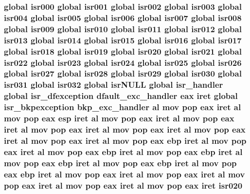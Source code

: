 \subsubsection[{\texorpdfstring{isr020}{isr020}}]{\setlength{\rightskip}{0pt plus 5cm}global {\bf isr000} global {\bf isr001} global {\bf isr002} global {\bf isr003} global {\bf isr004} global {\bf isr005} global {\bf isr006} global {\bf isr007} global {\bf isr008} global {\bf isr009} global {\bf isr010} global {\bf isr011} global {\bf isr012} global {\bf isr013} global {\bf isr014} global {\bf isr015} global {\bf isr016} global {\bf isr017} global {\bf isr018} global {\bf isr019} global isr020 global {\bf isr021} global {\bf isr022} global {\bf isr023} global {\bf isr024} global {\bf isr025} global {\bf isr026} global {\bf isr027} global {\bf isr028} global {\bf isr029} global {\bf isr030} global {\bf isr031} global isr032 global isr\+N\+U\+LL global isr\+\_\+handler global {\bf isr\+\_\+dfexception} {\bf dfault\+\_\+exc\+\_\+handler} eax iret global {\bf isr\+\_\+bkpexception} {\bf bkp\+\_\+exc\+\_\+handler} {\bf al} {\bf mov} pop eax iret {\bf al} {\bf mov} pop eax esp iret {\bf al} {\bf mov} pop eax iret {\bf al} {\bf mov} pop eax iret {\bf al} {\bf mov} pop eax iret {\bf al} {\bf mov} pop eax iret {\bf al} {\bf mov} pop eax iret {\bf al} {\bf mov} pop eax iret {\bf al} {\bf mov} pop eax ebp iret {\bf al} {\bf mov} pop eax iret {\bf al} {\bf mov} pop eax ebp iret {\bf al} {\bf mov} pop eax ebp iret {\bf al} {\bf mov} pop eax ebp iret {\bf al} {\bf mov} pop eax ebp iret {\bf al} {\bf mov} pop eax ebp iret {\bf al} {\bf mov} pop eax iret {\bf al} {\bf mov} pop eax iret {\bf al} {\bf mov} pop eax iret {\bf al} {\bf mov} pop eax iret {\bf al} {\bf mov} pop eax iret isr020}\hypertarget{isrs_8as_af9cb7ba1465715af81ff1a05ea1301bc}{}\label{isrs_8as_af9cb7ba1465715af81ff1a05ea1301bc}
